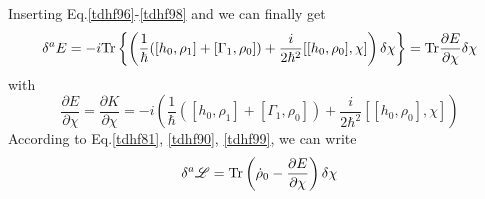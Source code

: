   Inserting Eq.\eqref{tdhf96}-\eqref{tdhf98} and we can finally get
  \begin{equation}
    \delta^a E = -i {\rm Tr}\left\{ \left( \frac{1}{\hbar}([h_0, \rho_1] + [\Gamma_1,\rho_0]) + \frac{i}{2\hbar^2}[[h_0,\rho_0],\chi] \right)\delta\chi \right\} = {\rm Tr}\frac{\partial E}{\partial\chi}\delta\chi  \label{tdhf99}
  \end{equation}
  with
  \begin{equation}
    \frac{\partial E}{\partial\chi} = \frac{\partial K}{\partial\chi} = -i  \left( \frac{1}{\hbar}([h_0, \rho_1] + [\Gamma_1,\rho_0]) + \frac{i}{2\hbar^2}[[h_0,\rho_0],\chi] \right)
  \end{equation}
  According to Eq.\eqref{tdhf81}, \eqref{tdhf90}, \eqref{tdhf99}, we can write
  \begin{equation}
    \delta^a\mathscr{L} = {\rm Tr}\left(\dot{\rho}_0 - \frac{\partial E}{\partial\chi}\right)\delta\chi \label{tdhf101}
  \end{equation}

